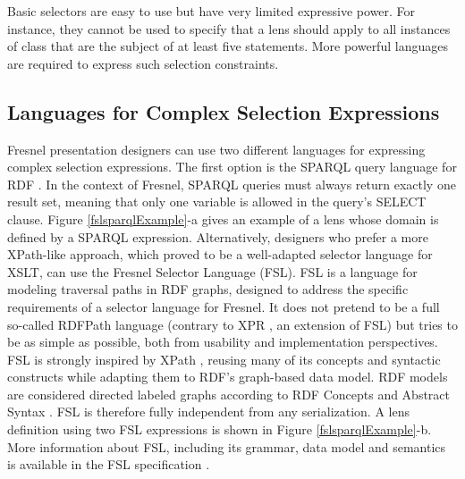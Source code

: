 
Basic selectors are easy to use but have very limited expressive power. For instance, they cannot be used to specify that a lens should apply to all instances of class  that are the subject of at least five  statements. More powerful languages are required to express such selection constraints.

\subsection{Languages for Complex Selection Expressions}

Fresnel presentation designers can use two different languages for expressing complex selection expressions. The first option is the SPARQL query language for RDF \cite{sparql05}. In the context of Fresnel, SPARQL queries must always return exactly one result set, meaning that only one variable is allowed in the query's SELECT clause. Figure \ref{fslsparqlExample}-a gives an example of a lens whose domain is defined by a SPARQL expression. Alternatively, designers who prefer a more XPath-like approach, which proved to be a well-adapted selector language for XSLT, can use the Fresnel Selector Language (FSL). FSL is a language for modeling traversal paths in RDF graphs, designed to address the specific requirements of a selector language for Fresnel. It does not pretend to be a full so-called RDFPath language (contrary to XPR \cite{xpr06}, an extension of FSL) but tries to be as simple as possible, both from usability and implementation perspectives. FSL is strongly inspired by XPath \cite{xpath}, reusing many of its concepts and syntactic constructs while adapting them to RDF's graph-based data model. RDF models are considered directed labeled graphs according to RDF Concepts and Abstract Syntax \cite{rdfcas04}. FSL is therefore fully independent from any serialization. A lens definition using two FSL expressions is shown in Figure \ref{fslsparqlExample}-b. More information about FSL, including its grammar, data model and semantics is available in the FSL specification \cite{fsl05}.

